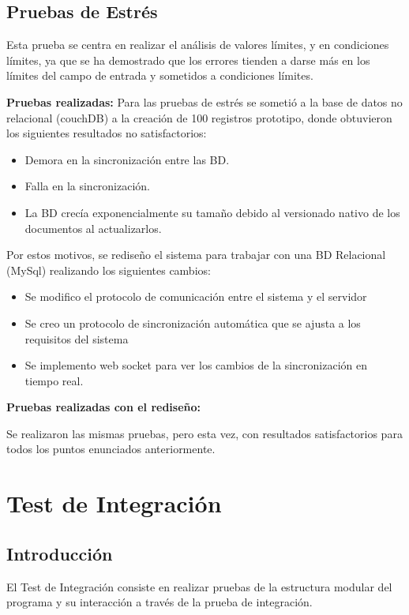 	\subsection{Pruebas de Estrés}

		Esta prueba se centra en realizar el análisis de valores límites, y en condiciones límites, ya que se ha demostrado que los errores tienden a darse más en los límites del campo de entrada y sometidos a condiciones límites.

		\newpage
		\textbf{Pruebas realizadas:}
		Para las pruebas de estrés se sometió a la base de datos no relacional (couchDB) a la creación de 100 registros prototipo, donde obtuvieron los siguientes resultados no satisfactorios:
		\begin{itemize}
			\item Demora en la sincronización entre las BD.
			\item Falla en la sincronización.
			\item La BD crecía exponencialmente su tamaño debido al versionado nativo de los documentos al actualizarlos.
		\end{itemize}
		Por estos motivos, se rediseño el sistema para trabajar con una BD Relacional (MySql) realizando los siguientes cambios:
		\begin{itemize}
			\item Se modifico el protocolo de comunicación entre el sistema y el servidor
			\item Se creo un protocolo de sincronización automática que se ajusta a los requisitos del sistema
			\item Se implemento web socket para ver los cambios de la sincronización en tiempo real.
		\end{itemize}
		
		\textbf{Pruebas realizadas con el rediseño:}

		Se realizaron las mismas pruebas, pero esta vez, con resultados satisfactorios para todos los puntos enunciados anteriormente.


\section{Test de Integración}

	\subsection{Introducción}

		El Test de Integración consiste en realizar pruebas de la estructura modular del programa y su interacción a través de la prueba de integración.

